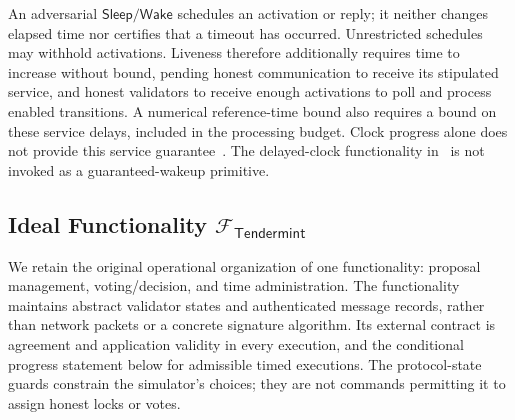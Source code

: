 \documentclass[conference,letterpaper,10pt]{IEEEtran}
\begin{document}
An adversarial $\mathsf{Sleep}/\mathsf{Wake}$ schedules an activation or reply; it neither changes elapsed time nor certifies that a timeout has occurred. Unrestricted schedules may withhold activations. Liveness therefore additionally requires time to increase without bound, pending honest communication to receive its stipulated service, and honest validators to receive enough activations to poll and process enabled transitions. A numerical reference-time bound also requires a bound on these service delays, included in the processing budget. Clock progress alone does not provide this service guarantee~\cite{katz2013universally}. The delayed-clock functionality in~\cite{canetti2017universally} is not invoked as a guaranteed-wakeup primitive.

\subsection{Ideal Functionality \texorpdfstring{$\mathcal{F}_{\scriptscriptstyle\mathsf{Tendermint}}$}{F-Tendermint}}

We retain the original operational organization of one functionality: proposal management, voting/decision, and time administration. The functionality maintains abstract validator states and authenticated message records, rather than network packets or a concrete signature algorithm. Its external contract is agreement and application validity in every execution, and the conditional progress statement below for admissible timed executions. The protocol-state guards constrain the simulator's choices; they are not commands permitting it to assign honest locks or votes.
\end{document}

